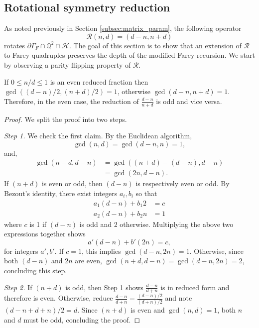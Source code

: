 \documentclass[12pt]{amsart}
\begin{document}
\subsection{Rotational symmetry reduction}  \label{subsec:rotation}
As noted previously in Section \ref{subsec:matrix_param}, the following operator
\begin{equation} \label{eq:rotation_tuples}
\mathcal{R}\left(n,d\right) = (d-n,n+d)
\end{equation}
rotates $\partial \Gamma_F \cap \mathbb{Q}^2 \cap \mathcal{H}$. The goal of this section is to show that an extension of $\mathcal{R}$
to Farey quadruples preserves the depth of the modified Farey recursion.  We start by observing a parity flipping property of $\mathcal{R}$. 
\begin{lemma} \label{lemma:rot_parity-laplace}
	If $0 \leq n/d \leq 1$ is an even reduced fraction then $\gcd( (d-n)/2,(n+d)/2) = 1$, otherwise 
	$\gcd(d-n,n+d) = 1$. Therefore, in the even case, the reduction of $\frac{d-n}{n+d}$ is odd and vice versa. 
\end{lemma}
\begin{proof}
	We split the proof into two steps. 
	
	{\it Step 1.} We check the first claim.
	By the Euclidean algorithm, 
	\[
	\gcd(n,d) = \gcd(d-n,n) =1,
	\]
	and, 
	\begin{align*}
	\gcd( n+d, d-n) &= \gcd( (n+d) - (d-n), d -n) \\
	&= \gcd( 2 n, d - n).
	\end{align*}
	If $(n+d)$ is even or odd, then $(d-n)$ is respectively even or odd. 
	By Bezout's identity, there exist integers $a_i, b_i$ so that
	\begin{align*}
	a_1 (d-n) + b_1 2 &= c  \\ 
	a_2 (d-n) + b_2 n &= 1
	\end{align*}
	where $c$ is 1 if $(d-n)$ is odd and 2 otherwise. Multiplying the above two expressions together shows
	\[
	a' (d-n) + b' ( 2 n ) = c, 
	\]
	for integers $a',b'$. If $c = 1$, this implies $\gcd(d-n, 2n) = 1$. Otherwise, since both $(d-n)$ and $2n$ are even, $\gcd(n+d,d-n) = \gcd(d-n, 2n) = 2$,
	concluding this step. 
		
	{\it Step 2.}
	If $(n+d)$ is odd, then Step 1 shows $ \frac{d-n}{d+n} $ is in reduced form and therefore is even. 
	Otherwise, reduce $\frac{d-n}{d+n} = \frac{ (d-n)/2}{ (d+n)/2}$ and note $( d-n + d + n)/2 = d$. Since $(n+d)$ is even and $\gcd(n,d) = 1$, both $n$ and $d$ must be odd, concluding the proof.
\end{proof}
\end{document}
